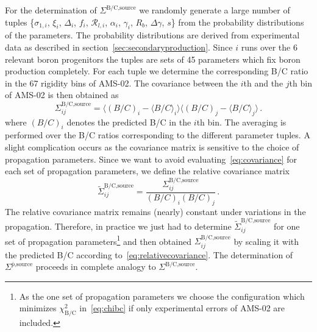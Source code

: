 \documentclass[a4paper,11pt]{article}
\newcommand{\R}{\mathcal{R}}
\begin{document}
For the determination of $\Sigma^\text{B/C,source}$ we randomly generate a large number of tuples \{$\sigma_{1,i}$, $\xi_i$, $\Delta_i$, $f_i$, $\R_{l,i}$, $\alpha_i$, $\gamma_i$, $R_b$, $\Delta\gamma$, $s$\} from the probability distributions of the parameters. The probability distributions are derived from experimental data as described in section~\ref{sec:secondaryproduction}. Since $i$ runs over the 6 relevant boron progenitors the tuples are sets of 45 parameters which fix boron production completely. For each tuple we determine the corresponding B/C ratio in the 67 rigidity bins of AMS-02. The covariance between the $i$th and the $j$th bin of AMS-02 is then obtained as
\begin{equation}\label{eq:covariance}
\Sigma_{ij}^\text{B/C,source}=  \Big\langle(B/C)_i - \big\langle B/C\big\rangle_i\Big\rangle \Big\langle(B/C)_j - \big\langle B/C\big\rangle_j\Big\rangle\,.
\end{equation}
where $(B/C)_i$ denotes the predicted B/C in the $i$th bin. The averaging is performed over the B/C ratios corresponding to the different parameter tuples. A slight complication occurs as the covariance matrix is sensitive to the choice of propagation parameters. Since we want to avoid evaluating~\eqref{eq:covariance} for each set of propagation parameters, we define the relative covariance matrix
\begin{equation}\label{eq:relativecovariance}
 \tilde{\Sigma}_{ij}^\text{B/C,source} = \frac{\Sigma_{ij}^\text{B/C,source}}{(B/C)_i (B/C)_j}\,.
\end{equation}
The relative covariance matrix remains (nearly) constant under variations in the propagation. Therefore, in practice we just had to determine $\tilde{\Sigma}_{ij}^\text{B/C,source}$ for one set of propagation parameters\footnote{As the one set of propagation parameters we choose the configuration which minimizes $\chi_{\text{B/C}}^2$ in~\eqref{eq:chibc} if only experimental errors of AMS-02 are included.} and then obtained $\Sigma_{ij}^\text{B/C,source}$ by scaling it with the predicted B/C according to~\eqref{eq:relativecovariance}. The determination of $\Sigma^\text{$\bar{p}$,source}$ proceeds in complete analogy to $\Sigma^\text{B/C,source}$.

\pagebreak



\end{document}
